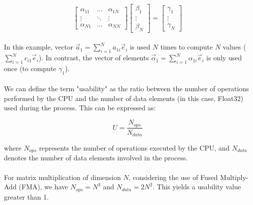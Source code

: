 \begin{equation}
    \begin{bmatrix}
        \alpha_{11} & \hdots & \alpha_{1N} \\
        \vdots & \ddots & \vdots \\
        \alpha_{N1} & \hdots & \alpha_{NN} 
    \end{bmatrix}
    \begin{bmatrix}
        \beta_{1} \\
        \vdots \\
        \beta_{N}
    \end{bmatrix}
    =
    \begin{bmatrix}
        \gamma_{1} \\
        \vdots \\
        \gamma_{N}
    \end{bmatrix}
    \label{eq_matrix2}
\end{equation}

\vspace{0.5cm}

\paragraph*{} In this example, vector $\vec{a}_1 = \sum_{i=1}^{N} a_{1i} \vec{e}_i$ is used $N$ times to compute $N$ values ($\sum_{i=1}^{N} c_{i1} \vec{e}_i$). 
In contrast, the vector of elements $\vec{\alpha}_1 = \sum_{i=1}^{N} \alpha_{1i} \vec{e}_i$ is only used once (to compute $\gamma_{1}$).

\paragraph*{} We can define the term "usability" as the ratio between the number of operations performed by the CPU and the number 
of data elements (in this case, Float32) used during the process. This can be expressed as:

\begin{equation}
    U = \frac{N_{ops}}{N_{data}}
\end{equation}

where $N_{ops}$ represents the number of operations executed by the CPU, and $N_{data}$ denotes the number of data elements 
involved in the process.

\paragraph*{} For matrix multiplication of dimension $N$, considering the use of Fused Multiply-Add (FMA), we have $N_{ops} = N^3$ 
and $N_{data} = 2N^2$. This yields a usability value greater than 1.

